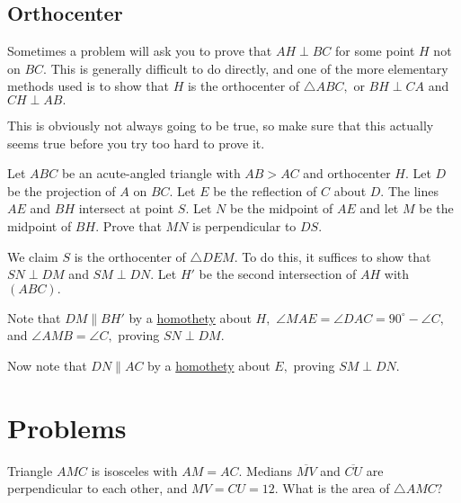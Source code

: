 \documentclass{article}
\begin{document}
\subsection{Orthocenter}
Sometimes a problem will ask you to prove that $AH\perp BC$ for some point $H$ not on $BC.$ This is generally difficult to do directly, and one of the more elementary methods used is to show that $H$ is the orthocenter of $\triangle ABC,$ or $BH\perp CA$ and $CH\perp AB.$

This is obviously not always going to be true, so make sure that this actually seems true before you try too hard to prove it.

\begin{exam}
Let $ABC$ be an acute-angled triangle with $AB> AC$ and orthocenter $H$. Let $D$ be the projection of $A$ on $BC$. Let $E$ be the reflection of $C$ about $D$. The lines $AE$ and $BH$ intersect at point $S$. Let $N$ be the midpoint of $AE$ and let $M$ be the midpoint of $BH$. Prove that $MN$ is perpendicular to $DS$.
\end{exam}

\begin{sol}
We claim $S$ is the orthocenter of $\triangle DEM.$ To do this, it suffices to show that $SN\perp DM$ and $SM\perp DN.$ Let $H'$ be the second intersection of $AH$ with $(ABC).$

Note that $DM\parallel BH'$ by a \hyperref[section:homothety]{homothety} about $H,$ $\angle MAE=\angle DAC=90^{\circ}-\angle C,$ and $\angle AMB=\angle C,$ proving $SN\perp DM.$

Now note that $DN\parallel AC$ by a \hyperref[section:homothety]{homothety} about $E,$ proving $SM\perp DN.$
\end{sol}

\pagebreak

\section{Problems}



\begin{prob}[AMC 10A 2020/12]{2}
Triangle $AMC$ is isosceles with $AM = AC$. Medians $\overline{MV}$ and $\overline{CU}$ are perpendicular to each other, and $MV=CU=12$. What is the area of $\triangle AMC?$
\end{prob}
\end{document}
